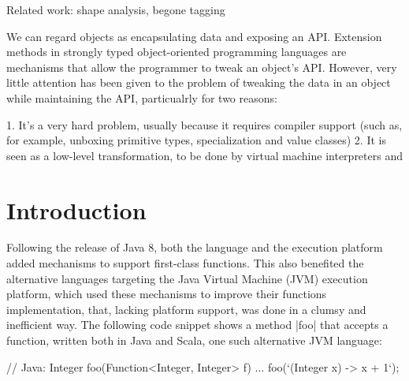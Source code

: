 Related work:
shape analysis, begone tagging












We can regard objects as encapsulating data and exposing an API. Extension methods in strongly typed object-oriented programming languages are mechanisms that allow the programmer to tweak an object's API. However, very little attention has been given to the problem of tweaking the data in an object while maintaining the API, particualrly for two reasons:

1. It's a very hard problem, usually because it requires compiler support (such as, for example, unboxing primitive types, specialization and value classes)
2. It is seen as a low-level transformation, to be done by virtual machine interpreters and




\section{Introduction}

Following the release of Java 8, both the language and the execution platform added mechanisms to support first-class functions. This also benefited the alternative languages targeting the Java Virtual Machine (JVM) execution platform, which used these mechanisms to improve their functions implementation, that, lacking platform support, was done in a clumsy and inefficient way. The following code snippet shows a method |foo| that accepts a function, written both in Java and Scala, one such alternative JVM language:

\begin{lstlisting-nobreak}
// Java:
Integer foo(Function<Integer, Integer> f) { ... }
foo(`(Integer x) -> x + 1`);
\end{lstlisting-nobreak}

